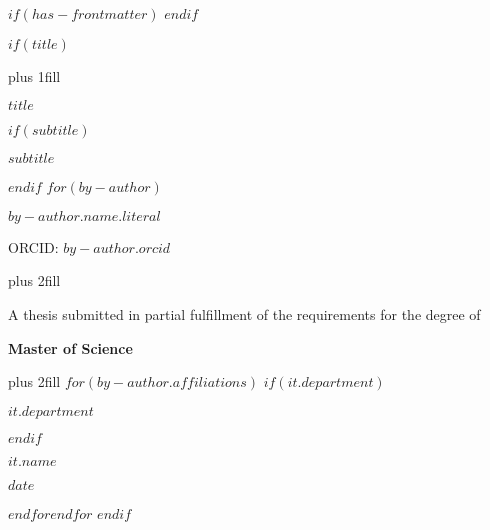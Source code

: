 $if(has-frontmatter)$
\frontmatter
$endif$


$if(title)$
\cleardoublepage
\thispagestyle{empty}
{\centering
\hbox{}\vskip 0cm plus 1fill
{\Large\bfseries $title$ \par}
$if(subtitle)$
\vspace{3ex}
{\small\bfseries $subtitle$ \par}
$endif$
\vspace{12ex}
$for(by-author)$
{\Large\bfseries $by-author.name.literal$ \par}
\vspace{3ex}
{\small ORCID: $by-author.orcid$ \par}
\vskip 0cm plus 2fill
\vspace{5ex}
{\large A thesis submitted in partial fulfillment of the requirements for the degree of \par}
{\bfseries\large Master of Science \par}
\vskip 0cm plus 2fill
\vspace{5ex}
$for(by-author.affiliations)$%
$if(it.department)$%
{\bfseries\large $it.department$ \par}
$endif$%
{\bfseries\large $it.name$ \par}
\vspace{12ex}
{\bfseries\large $date$ \par}
\vspace{12ex}
}
$endfor$$endfor$
$endif$

